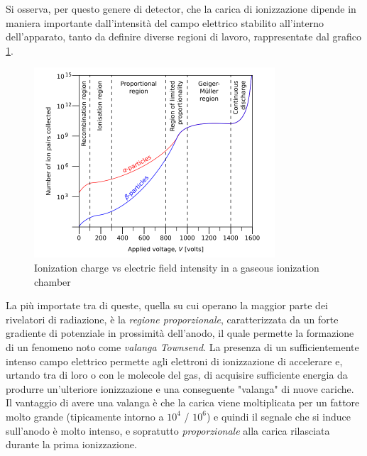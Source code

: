\documentclass[a4paper,11pt]{book}
\begin{document}
Si osserva, per questo genere di detector, che la carica di ionizzazione dipende in maniera importante dall'intensità del campo elettrico stabilito all'interno dell'apparato, tanto da definire diverse regioni di lavoro, rappresentate dal grafico \ref{fig:ion_ch_work_regions}.\\


\begin{figure}[hbtp]
\centering
\includegraphics[scale=1.5]{pictures/work_region_det.pdf}
\caption{Ionization charge vs electric field intensity in a gaseous ionization chamber}
\label{fig:ion_ch_work_regions}
\end{figure}


La più importate tra di queste, quella su cui operano la maggior parte dei rivelatori di radiazione, è la \textit{regione proporzionale}, caratterizzata da un forte gradiente di potenziale in prossimità dell'anodo, il quale permette la formazione di un fenomeno noto come \textit{valanga Townsend}. La presenza di un sufficientemente intenso campo elettrico permette agli elettroni di ionizzazione di accelerare e, urtando tra di loro o con le molecole del gas, di acquisire sufficiente energia da produrre un'ulteriore ionizzazione e una conseguente "valanga" di nuove cariche.\\
Il vantaggio di avere una valanga è che la carica viene moltiplicata per un fattore molto grande (tipicamente intorno a $10^4$ / $10^6$) e quindi il segnale che si induce sull'anodo è molto intenso, e sopratutto \textit{proporzionale} alla carica rilasciata durante la prima ionizzazione.\\
\end{document}
